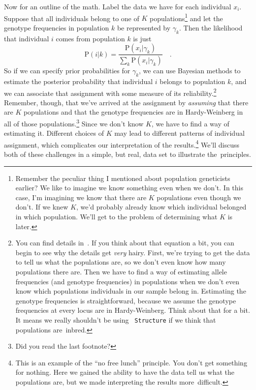 \documentclass[12pt]{article}
\begin{document}
Now for an outline of the math. Label the data we have for each
individual $x_i$. Suppose that all individuals belong to one of $K$
populations\footnote{Remember the peculiar thing I mentioned about
  population geneticists earlier? We like to imagine we know something
  even when we don't. In this case, I'm imagining we know that there
  are $K$ populations even though we don't. If we knew $K$, we'd
  probably already know which individual belonged in which
  population. We'll get to the problem of determining what $K$ is
  later.} and let the genotype frequencies in population $k$ be
represented by $\gamma_k$. Then the likelihood that individual $i$
comes from population $k$ is just
\[
\mbox{P}(i|k) = \frac{\mbox{P}(x_i|\gamma_k)}{\sum_k
  \mbox{P}(x_i|\gamma_k)} \quad .
\]
So if we can specify prior probabilities for $\gamma_k$, we can use
Bayesian methods to estimate the posterior probability that individual
$i$ belongs to population $k$, and we can associate that assignment
with some measure of its reliability.\footnote{You can find details
  in~\cite{Pritchard-etal-2000}. If you think about that equation a
  bit, you can begin to see why the details get {\it very\/}
  hairy. First, we're trying to get the data to tell us what the
  populations are, so we don't even know how many populations there
  are. Then we have to find a way of estimating allele frequencies
  (and genotype frequencies) in populations when we don't even know
  which populations individuals in our sample belong in. Estimating
  the genotype frequencies is straightforward, because we assume the
  genotype frequencies at every locus are in Hardy-Weinberg. Think
  about that for a bit. It means we really shouldn't be using {\tt
    Structure} if we think that populations are~inbred.}  Remember,
though, that we've arrived at the assignment by {\it assuming\/} that
there are $K$ populations and that the genotype frequencies are in
Hardy-Weinberg in all of those populations.\footnote{Did you read the
  last footnote?} Since we don't know $K$, we have to find a way of
estimating it. Different choices of $K$ may lead to different patterns
of individual assignment, which complicates our interpretation of the
results.\footnote{This is an example of the ``no free lunch''
  principle. You don't get something for nothing. Here we gained the
  ability to have the data tell us what the populations are, but we
  made interpreting the results more~difficult.} We'll discuss both of
these challenges in a simple, but real, data set to illustrate
the~principles.
\end{document}
